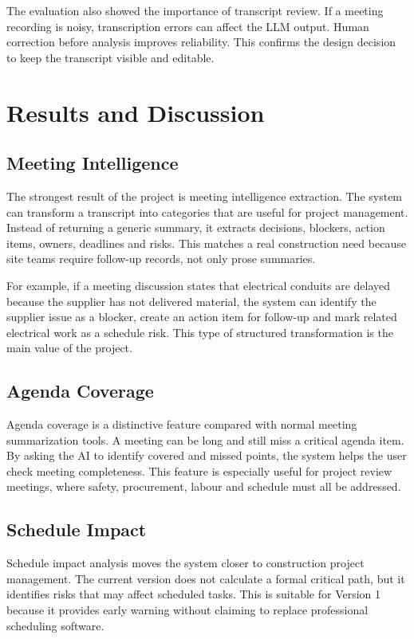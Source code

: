 \documentclass[11pt,a4paper]{article}
\begin{document}
The evaluation also showed the importance of transcript review. If a meeting recording is noisy, transcription errors can affect the LLM output. Human correction before analysis improves reliability. This confirms the design decision to keep the transcript visible and editable.

\section{Results and Discussion}

\subsection{Meeting Intelligence}

The strongest result of the project is meeting intelligence extraction. The system can transform a transcript into categories that are useful for project management. Instead of returning a generic summary, it extracts decisions, blockers, action items, owners, deadlines and risks. This matches a real construction need because site teams require follow-up records, not only prose summaries.

For example, if a meeting discussion states that electrical conduits are delayed because the supplier has not delivered material, the system can identify the supplier issue as a blocker, create an action item for follow-up and mark related electrical work as a schedule risk. This type of structured transformation is the main value of the project.

\subsection{Agenda Coverage}

Agenda coverage is a distinctive feature compared with normal meeting summarization tools. A meeting can be long and still miss a critical agenda item. By asking the AI to identify covered and missed points, the system helps the user check meeting completeness. This feature is especially useful for project review meetings, where safety, procurement, labour and schedule must all be addressed.

\subsection{Schedule Impact}

Schedule impact analysis moves the system closer to construction project management. The current version does not calculate a formal critical path, but it identifies risks that may affect scheduled tasks. This is suitable for Version 1 because it provides early warning without claiming to replace professional scheduling software.
\end{document}
